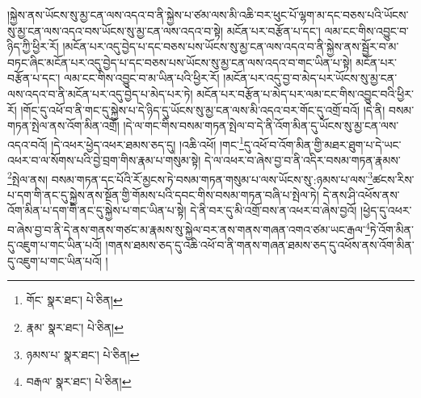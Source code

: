 །སྐྱེས་ནས་ཡོངས་སུ་མྱ་ངན་ལས་འདའ་བ་ནི་སྐྱེས་པ་ཙམ་ལས་མི་འཆི་བར་ཕུང་པོ་ལྷག་མ་དང་བཅས་པའི་ཡོངས་སུ་མྱ་ངན་ལས་འདའ་བས་ཡོངས་སུ་མྱ་ངན་ལས་འདའ་བ་སྟེ། མངོན་པར་བརྩོན་པ་དང་། ལམ་ངང་གིས་འབྱུང་བ་ཉིད་ཀྱི་ཕྱིར་རོ། །མངོན་པར་འདུ་བྱེད་པ་དང་བཅས་པས་ཡོངས་སུ་མྱ་ངན་ལས་འདའ་བ་ནི་སྐྱེས་ནས་སྦྱོར་བ་མ་བཏང་ཞིང་མངོན་པར་འདུ་བྱེད་པ་དང་བཅས་པས་ཡོངས་སུ་མྱ་ངན་ལས་འདའ་བ་གང་ཡིན་པ་སྟེ། མངོན་པར་བརྩོན་པ་དང་། ལམ་ངང་གིས་འབྱུང་བ་མ་ཡིན་པའི་ཕྱིར་རོ། །མངོན་པར་འདུ་བྱ་བ་མེད་པར་ཡོངས་སུ་མྱ་ངན་ལས་འདའ་བ་ནི་མངོན་པར་འདུ་བྱེད་པ་མེད་པར་ཏེ། མངོན་པར་བརྩོན་པ་མེད་པར་ལམ་ངང་གིས་འབྱུང་བའི་ཕྱིར་རོ། །གོང་དུ་འཕོ་བ་ནི་གང་དུ་སྐྱེས་པ་དེ་ཉིད་དུ་ཡོངས་སུ་མྱ་ངན་ལས་མི་འདའ་བར་གོང་དུ་འགྲོ་བའོ། །དེ་ནི། བསམ་གཏན་སྤེལ་ནས་འོག་མིན་འགྲོ། །དེ་ལ་གང་གིས་བསམ་གཏན་སྤེལ་བ་དེ་ནི་འོག་མིན་དུ་ཡོངས་སུ་མྱ་ངན་ལས་འདའ་བའོ། །དེ་འཕར་ཕྱེད་འཕར་ཐམས་ཅད་དུ། །འཆི་འཕོ། །གང་\footnote{གོང་  སྣར་ཐང་།  པེ་ཅིན། }དུ་འཕོ་བ་འོག་མིན་གྱི་མཐར་ཐུག་པ་དེ་ཡང་འཕར་བ་ལ་སོགས་པའི་བྱེ་བྲག་གིས་རྣམ་པ་གསུམ་སྟེ། དེ་ལ་འཕར་བ་ཞེས་བྱ་བ་ནི་འདིར་བསམ་གཏན་རྣམས་\footnote{རྣམ་  སྣར་ཐང་།  པེ་ཅིན། }སྤེལ་ནས། བསམ་གཏན་དང་པོའི་རོ་མྱངས་ཏེ་བསམ་གཏན་གསུམ་པ་ལས་ཡོངས་སུ་:ཉམས་པ་ལས་\footnote{ཉམས་པ་  སྣར་ཐང་།  པེ་ཅིན། }ཚངས་རིས་པ་དག་གི་ནང་དུ་སྐྱེས་ནས་སྔོན་གྱི་གོམས་པའི་དབང་གིས་བསམ་གཏན་བཞི་པ་སྤེལ་ཏེ། དེ་ནས་ཤི་འཕོས་ནས་འོག་མིན་པ་དག་གི་ནང་དུ་སྐྱེས་པ་གང་ཡིན་པ་སྟེ། དེ་ནི་བར་དུ་མི་འགྲོ་བས་ན་འཕར་བ་ཞེས་བྱའོ། །ཕྱེད་དུ་འཕར་བ་ཞེས་བྱ་བ་ནི་དེ་ནས་གནས་གཙང་མ་རྣམས་སུ་སྐྱེལ་བར་ནས་གནས་གཞན་འགའ་ཙམ་ཡང་རྒལ་\footnote{བརྒལ་  སྣར་ཐང་།  པེ་ཅིན། }ཏེ་འོག་མིན་དུ་འཇུག་པ་གང་ཡིན་པའོ། །གནས་ཐམས་ཅད་དུ་འཆི་འཕོ་བ་ནི་གནས་གཞན་ཐམས་ཅད་དུ་འཕོས་ནས་འོག་མིན་དུ་འཇུག་པ་གང་ཡིན་པའོ། །

